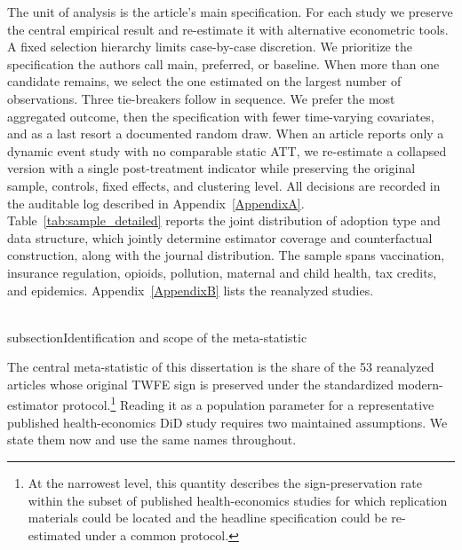 \documentclass[11pt]{article}
\begin{document}
The unit of analysis is the article's main specification. For each study we preserve the central empirical result and re-estimate it with alternative econometric tools. A fixed selection hierarchy limits case-by-case discretion. We prioritize the specification the authors call main, preferred, or baseline. When more than one candidate remains, we select the one estimated on the largest number of observations. Three tie-breakers follow in sequence. We prefer the most aggregated outcome, then the specification with fewer time-varying covariates, and as a last resort a documented random draw. When an article reports only a dynamic event study with no comparable static ATT, we re-estimate a collapsed version with a single post-treatment indicator while preserving the original sample, controls, fixed effects, and clustering level. All decisions are recorded in the auditable log described in Appendix~\ref{AppendixA}. Table~\ref{tab:sample_detailed} reports the joint distribution of adoption type and data structure, which jointly determine estimator coverage and counterfactual construction, along with the journal distribution. The sample spans vaccination, insurance regulation, opioids, pollution, maternal and child health, tax credits, and epidemics. Appendix~\ref{AppendixB} lists the reanalyzed studies.



\\subsection{Identification and scope of the meta-statistic}
\label{sec:identification}

The central meta-statistic of this dissertation is the share of the 53 reanalyzed articles whose original TWFE sign is preserved under the standardized modern-estimator protocol.\footnote{At the narrowest level, this quantity describes the sign-preservation rate within the subset of published health-economics studies for which replication materials could be located and the headline specification could be re-estimated under a common protocol.} Reading it as a population parameter for a representative published health-economics DiD study requires two maintained assumptions. We state them now and use the same names throughout.
\end{document}
